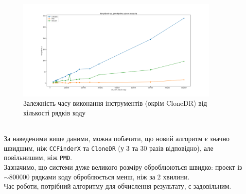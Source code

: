 \documentclass[a4paper, 14pt]{article}
\begin{document}
\begin{figure}[h]
    \centering
    \includegraphics[width=0.9\textwidth]{graph2}
    \caption{\centering Залежність часу виконання інструментів (окрім CloneDR) від кількості рядків коду}
\end{figure} \hfill \\
За наведеними вище даними, можна побачити, що новий алгоритм є значно швидшим, ніж \verb|CCFinderX| та \verb|CloneDR| (у $3$ та $30$ разів відповідно), але повільнишим, ніж \verb|PMD|. \\
Зазначимо, що системи дуже великого розміру оброблюються швидко: проект із $\sim$800000 рядками коду оброблюється менш, ніж за 2 хвилини. \\
Час роботи, потрібний алгоритму для обчислення результату, є задовільним.
\end{document}
